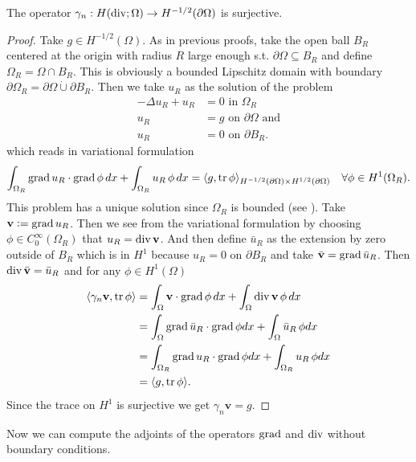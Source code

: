 \documentclass[../main.tex]{subfiles}
\begin{document}
\begin{theorem}
    The operator $\gamma_n: H(\operatorname{div}; \Omega) \rightarrow H^{-1/2}(\partial\Omega)$ 
    is surjective.
\end{theorem}
\begin{proof}
    Take $g \in H^{-1/2}(\Omega)$. As in previous proofs, take 
    the open ball $B_R$ centered at the origin with radius $R$ large enough 
    s.t. $\partial \Omega\subseteq B_R$ and define $\Omega_R = \Omega \cap B_R$.
    This is obviously a bounded Lipschitz domain with boundary 
    $\partial \Omega_R = \partial \Omega \dot{\cup} \partial B_R$.
    Then we take $u_R$ as the solution 
    of the problem 
    \begin{align*}
        -\Delta u_R + u_R &= 0 \text{ in $\Omega_R$} \\
        u_R &= g \text{ on $\partial \Omega$ and} 
        \\ u_R &= 0 \text{ on $\partial B_R$.} 
    \end{align*}
    which reads in variational formulation
    \begin{align*}
        \int_{\Omega_R} \operatorname{grad} u_R \cdot \operatorname{grad} \phi \, dx + \int_{\Omega_R} u_R \, \phi \,dx 
        = \langle g, \operatorname{tr} \phi \rangle_{H^{-1/2}(\partial \Omega) \times H^{1/2}(\partial \Omega)} \quad \forall \phi \in H^1(\Omega_R).
    \end{align*}
    This problem has a unique solution since $\Omega_R$ is bounded (see \cite[Thm. 3.12]{monk}).
    Take $\mathbf{v} \vcentcolon= \operatorname{grad} u_R$. Then we see from the variational 
    formulation by choosing $\phi \in C_0^\infty(\Omega_R)$ that $u_R = \operatorname{div} \mathbf{v}$.
    And then define $\bar{u}_R$ as the extension by zero outside of $B_R$ which is in $H^1$ 
    because $u_R = 0$ on $\partial B_R$ and take $\bar{\mathbf{v}} = \operatorname{grad} \bar{u}_R$. 
    Then $\operatorname{div} \bar{\mathbf{v}} = \bar{u}_R$
    and for any $\phi \in H^1(\Omega)$
    \begin{align*}
        \langle \gamma_n \mathbf{v}, \operatorname{tr} \phi \rangle 
        &= \int_\Omega \mathbf{v} \cdot \operatorname{grad} \phi \, dx 
            + \int_\Omega \operatorname{div} \mathbf{v} \, \phi \, dx
        \\ &= \int_\Omega \operatorname{grad} \bar{u}_R \cdot \operatorname{grad} \phi dx
            + \int_\Omega \bar{u}_R \, \phi dx 
        \\ &= \int_{\Omega_R} \operatorname{grad} u_R \cdot \operatorname{grad} \phi dx
            + \int_{\Omega_R} u_R \, \phi dx 
        \\ &= \langle g, \operatorname{tr} \phi \rangle.
    \end{align*}
    Since the trace on $H^1$ is surjective we get $\gamma_n \mathbf{v} = g$.
\end{proof}
Now we can compute the adjoints of the operators $\operatorname{grad}$ and $\operatorname{div}$ without boundary conditions.
\end{document}
